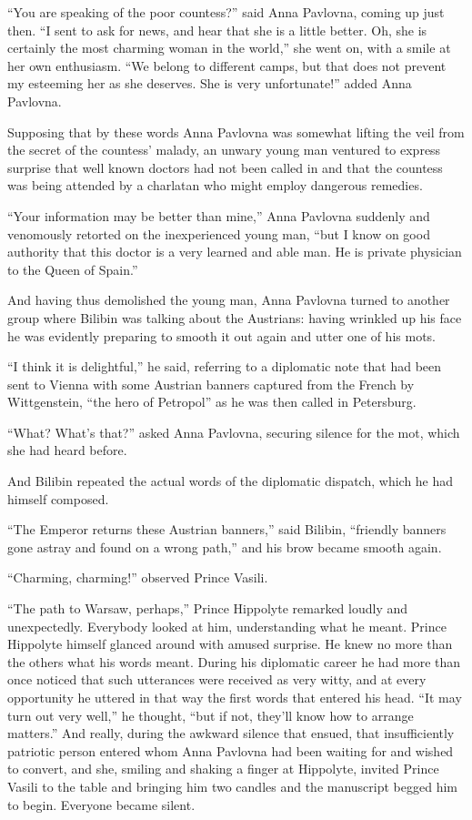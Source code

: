 ``You are speaking of the poor countess?'' said Anna Pavlovna,
coming up just then. ``I sent to ask for news, and hear that she
is a little better. Oh, she is certainly the most charming woman
in the world,'' she went on, with a smile at her own
enthusiasm. ``We belong to different camps, but that does not
prevent my esteeming her as she deserves. She is very
unfortunate!'' added Anna Pavlovna.

Supposing that by these words Anna Pavlovna was somewhat lifting
the veil from the secret of the countess' malady, an unwary young
man ventured to express surprise that well known doctors had not
been called in and that the countess was being attended by a
charlatan who might employ dangerous remedies.

``Your information may be better than mine,'' Anna Pavlovna
suddenly and venomously retorted on the inexperienced young man,
``but I know on good authority that this doctor is a very learned
and able man. He is private physician to the Queen of Spain.''

And having thus demolished the young man, Anna Pavlovna turned to
another group where Bilibin was talking about the Austrians:
having wrinkled up his face he was evidently preparing to smooth
it out again and utter one of his mots.

``I think it is delightful,'' he said, referring to a diplomatic
note that had been sent to Vienna with some Austrian banners
captured from the French by Wittgenstein, ``the hero of
Petropol'' as he was then called in Petersburg.

``What? What's that?'' asked Anna Pavlovna, securing silence for
the mot, which she had heard before.

And Bilibin repeated the actual words of the diplomatic dispatch,
which he had himself composed.

``The Emperor returns these Austrian banners,'' said Bilibin,
``friendly banners gone astray and found on a wrong path,'' and
his brow became smooth again.

``Charming, charming!'' observed Prince Vasili.

``The path to Warsaw, perhaps,'' Prince Hippolyte remarked loudly
and unexpectedly. Everybody looked at him, understanding what he
meant.  Prince Hippolyte himself glanced around with amused
surprise. He knew no more than the others what his words
meant. During his diplomatic career he had more than once noticed
that such utterances were received as very witty, and at every
opportunity he uttered in that way the first words that entered
his head. ``It may turn out very well,'' he thought, ``but if
not, they'll know how to arrange matters.'' And really, during
the awkward silence that ensued, that insufficiently patriotic
person entered whom Anna Pavlovna had been waiting for and wished
to convert, and she, smiling and shaking a finger at Hippolyte,
invited Prince Vasili to the table and bringing him two candles
and the manuscript begged him to begin. Everyone became silent.

